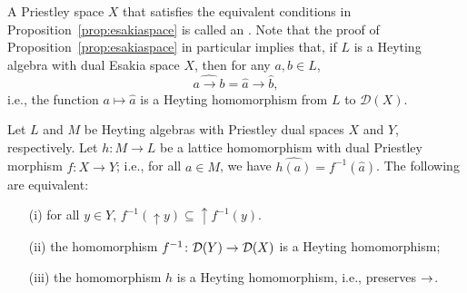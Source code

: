 A Priestley space $X$ that satisfies the equivalent conditions in Proposition~\ref{prop:esakiaspace} is called an . Note that the proof of Proposition~\ref{prop:esakiaspace} in particular implies that, if $L$ is a Heyting algebra with dual Esakia space $X$, then for any $a, b \in L$,
\[ \widehat{a \to b} = \widehat{a} \to \widehat{b},\]
i.e., the function $a \mapsto \widehat{a}$ is a Heyting homomorphism from $L$ to $\mathcal{D}(X)$.


\begin{proposition}\label{prop:esakiamorphisms}
  Let $L$ and $M$ be Heyting algebras with Priestley dual spaces $X$ and $Y$, respectively. Let $h \colon M \to L$ be a lattice homomorphism with dual Priestley morphism $f \colon X \to Y$; i.e., for all $a \in M$, we have $\widehat{h(a)} = f^{-1}(\widehat{a})$. The following are equivalent:
  \begin{enumerate}
  \item[(i)] for all $y \in Y$, $f^{-1}({\uparrow} y) \subseteq {\uparrow} f^{-1}(y)$.
  \item[(ii)] the homomorphism $f^{-1} \colon \mathcal{D}(Y) \to \mathcal{D}(X)$ is a Heyting homomorphism;
  \item[(iii)] the homomorphism $h$ is a Heyting homomorphism, i.e., preserves $\to$.
  \end{enumerate}
  \end{proposition}
  
